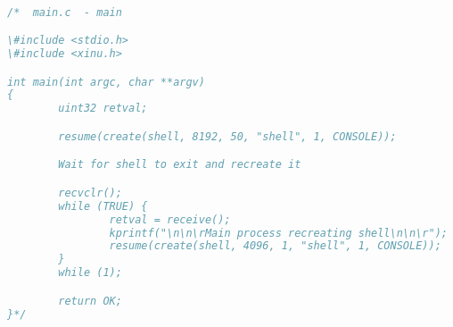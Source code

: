 \documentclass{article}
\begin{document}
\begin{lstlisting}[language=c]

/*  main.c  - main

\#include <stdio.h>
\#include <xinu.h>

int main(int argc, char **argv)
{
        uint32 retval;

        resume(create(shell, 8192, 50, "shell", 1, CONSOLE));

        Wait for shell to exit and recreate it

        recvclr();
        while (TRUE) {
                retval = receive();
                kprintf("\n\n\rMain process recreating shell\n\n\r");
                resume(create(shell, 4096, 1, "shell", 1, CONSOLE));
        }
        while (1);

        return OK;
}*/


\end{lstlisting}
\end{document}
